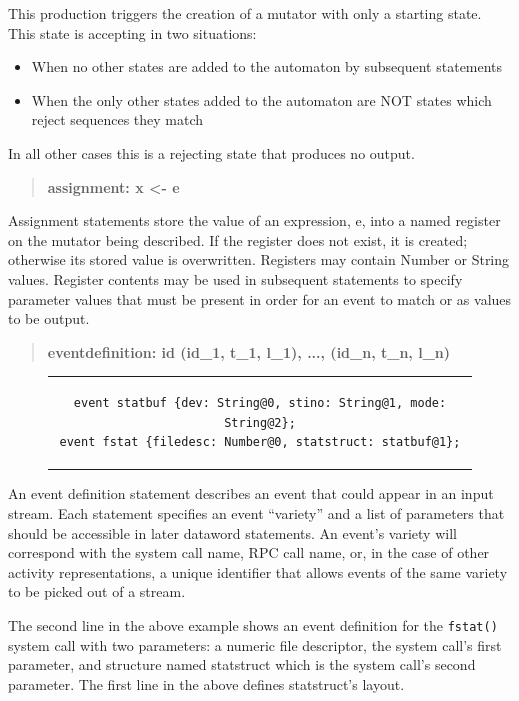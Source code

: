 This production triggers the creation of a mutator with only a starting
state.  This state is accepting in two situations:
\begin{itemize}
  \item{When no other states are added to the automaton by subsequent
    statements}
  \item{When the only other states added to the automaton are NOT states
    which reject sequences they match}
\end{itemize}
In all other cases this is a rejecting state that produces no output.

\begin{quote}
\centering
\textbf{assignment: x <- e}
\end{quote}

Assignment statements store the value of an expression, e, into a named
register on the mutator being described.
If the register does not exist,
it is created;
otherwise its stored value is overwritten.
Registers may contain Number or String values.  Register contents
may be used in subsequent statements to specify parameter values that must
be present in order for an event to match or as values to be output.

\begin{quote}
\centering
\textbf{eventdefinition: id (id\_1, t\_1, l\_1), ..., (id\_n, t\_n, l\_n) }
\end{quote}

\begin{figure}[H]
\centering
\begin{tabular}{c}
\begin{lstlisting}
event statbuf {dev: String@0, stino: String@1, mode: String@2};
event fstat {filedesc: Number@0, statstruct: statbuf@1};
\end{lstlisting}
\end{tabular}
\end{figure}

An event definition statement describes an event that could appear in an input
stream.  Each statement specifies an event ``variety'' and a list of
parameters that should be accessible in later dataword statements.
An event's variety will correspond
with the system call name, RPC call name, or, in the case of other activity
representations, a unique identifier that allows events of the same
variety to be picked out of a stream.

The second line in the above example shows an event
definition for
the {\tt fstat()} system call
with two parameters:
a numeric file descriptor, the system call's first parameter,
and structure named statstruct
which is the system call's second parameter.
The first line in the above defines statstruct's layout.


